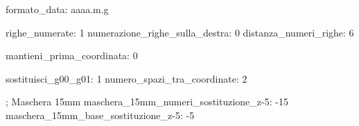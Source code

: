 formato_data: aaaa.m.g

righe_numerate:                 1
numerazione_righe_sulla_destra: 0
distanza_numeri_righe:          6

mantieni_prima_coordinata:      0

sostituisci_g00_g01:         1
numero_spazi_tra_coordinate: 2

; Maschera 15mm
maschera_15mm_numeri_sostituzione_z-5: -15
maschera_15mm_base_sostituzione_z-5: -5
